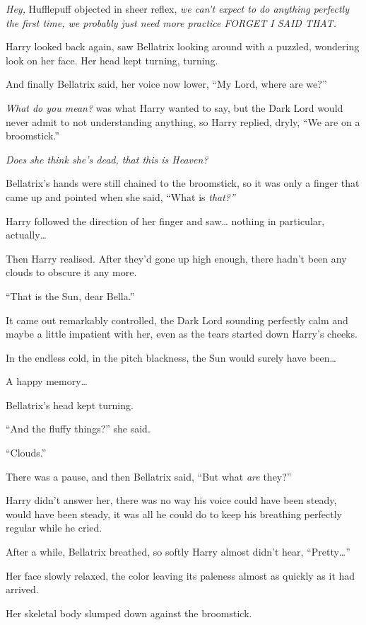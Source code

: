 \emph{Hey,} Hufflepuff objected in sheer reflex, \emph{we can't expect
to do anything perfectly the first time, we probably just need more
practice FORGET I SAID THAT.}

Harry looked back again, saw Bellatrix looking around with a puzzled,
wondering look on her face. Her head kept turning, turning.

And finally Bellatrix said, her voice now lower, ``My Lord, where are
we?''

\emph{What do you mean?} was what Harry wanted to say, but the Dark Lord
would never admit to not understanding anything, so Harry replied,
dryly, ``We are on a broomstick.''

\emph{Does she think she's dead, that this is Heaven?}

Bellatrix's hands were still chained to the broomstick, so it was only a
finger that came up and pointed when she said, ``What is \emph{that?''}

Harry followed the direction of her finger and saw\ldots{} nothing in
particular, actually\ldots{}

Then Harry realised. After they'd gone up high enough, there hadn't been
any clouds to obscure it any more.

``That is the Sun, dear Bella.''

It came out remarkably controlled, the Dark Lord sounding perfectly calm
and maybe a little impatient with her, even as the tears started down
Harry's cheeks.

In the endless cold, in the pitch blackness, the Sun would surely have
been\ldots{}

A happy memory\ldots{}

Bellatrix's head kept turning.

``And the fluffy things?'' she said.

``Clouds.''

There was a pause, and then Bellatrix said, ``But what \emph{are}
they?''

Harry didn't answer her, there was no way his voice could have been
steady, would have been steady, it was all he could do to keep his
breathing perfectly regular while he cried.

After a while, Bellatrix breathed, so softly Harry almost didn't hear,
``Pretty\ldots{}''

Her face slowly relaxed, the color leaving its paleness almost as
quickly as it had arrived.

Her skeletal body slumped down against the broomstick.


